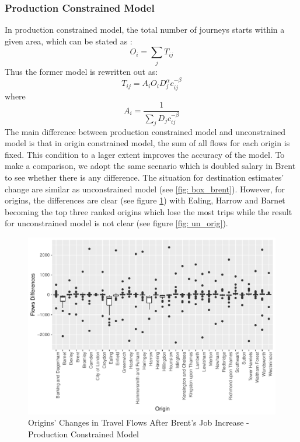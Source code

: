 \documentclass[a4paper,reqno,]{article}
\begin{document}
\subsubsection{Production Constrained Model}
\label{sssec:production models}
In production constrained model, the total number of journeys starts within a given area, which can be stated as :
\begin{equation}
O_i=\sum_{j}T_{ij} 
\end{equation}
Thus the former model is rewritten out as:
\begin{equation}
T_{ij}=A_i O_i D_j^{\alpha} c_{ij}^{-\beta}
\end{equation}
where 
\begin{equation}
A_i=\frac{1}{\sum_{j}{D_j c_{ij}^{-\beta}}}
\end{equation}
The main difference between production constrained model and unconstrained model is that in origin constrained model, the sum of all flows for each origin is fixed. This condition to a lager extent improves the accuracy of the model. To make a comparison, we adopt the same scenario which is doubled salary in Brent to see whether there is any difference. The situation for destination estimates' change are similar as unconstrained model (see \ref{fig: box_brent}). However, for origins, the differences are clear (see figure \ref{fig: pro_orig}) with Ealing, Harrow and Barnet becoming the top three ranked origins which lose the most trips while the result for unconstrained model is not clear (see figure \ref{fig: un_orig}).
\begin{figure}[H]
\centering
\begin{minipage}[b]{1\linewidth}
\centering
    \captionsetup{width=1\linewidth}
    \includegraphics[width=1\textwidth]{images/SIM/pro_orig.pdf}
    \caption{Origins' Changes in Travel Flows After Brent's Job Increase - Production Constrained Model}\label{fig: pro_orig}
\end{minipage}
\end{figure} 
\end{document}

